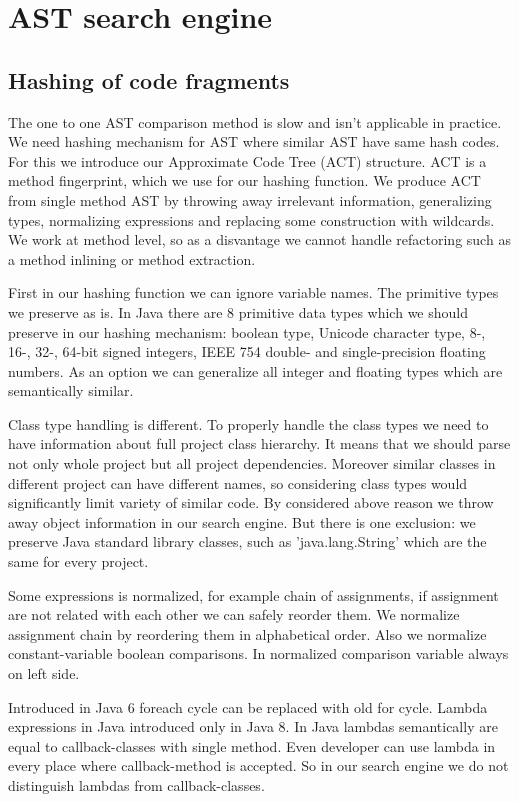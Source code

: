 \section{AST search engine}

\subsection{Hashing of code fragments}

The one to one AST comparison method is slow and isn't applicable in practice.
We need hashing mechanism for AST where similar AST have same hash codes. For this we
introduce our Approximate Code Tree (ACT) structure. ACT is a method fingerprint,
which we use for our hashing function. We produce ACT from single method AST by
throwing away irrelevant information, generalizing types, normalizing expressions and replacing some construction with
wildcards. We work at method level, so as a disvantage we cannot handle
refactoring such as a method inlining or method extraction.

First in our hashing function we can ignore variable names. The primitive types
we preserve as is. In Java there are 8 primitive data types which we should
preserve in our hashing mechanism: boolean type, Unicode character type, 8-,
16-, 32-, 64-bit signed integers, IEEE 754 double- and single-precision floating numbers. As an option
we can generalize all integer and floating types which are semantically similar.

Class type handling is different. To properly handle the class types we need to
have information about full project class hierarchy. It means that we should parse not
only whole project but all project dependencies. Moreover similar classes in
different project can have different names, so considering class types would
significantly limit variety of similar code. By considered above reason we throw
away object information in our search engine. But there is one exclusion: we
preserve Java standard library classes, such as 'java.lang.String' which are the
same for every project.

Some expressions is normalized, for example chain of assignments, if assignment
are not related with each other we can safely reorder them. We normalize
assignment chain by reordering them in alphabetical order. Also we normalize
constant-variable boolean comparisons. In normalized comparison variable always
on left side.

Introduced in Java 6 foreach cycle can be replaced with old for cycle. Lambda
expressions in Java introduced only in Java 8. In Java lambdas semantically
are equal to callback-classes with single method. Even developer can use
lambda in every place where callback-method is accepted. So in our search engine
we do not distinguish lambdas from callback-classes.

